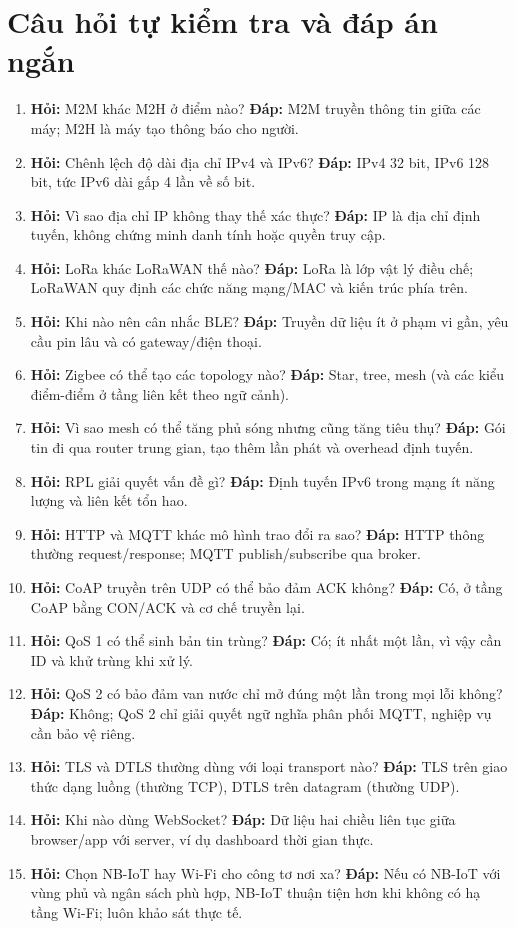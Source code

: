 \section{Câu hỏi tự kiểm tra và đáp án ngắn}
\begin{enumerate}[leftmargin=7mm,itemsep=7pt]
\item \textbf{Hỏi:} M2M khác M2H ở điểm nào? \textbf{Đáp:} M2M truyền thông tin giữa các máy; M2H là máy tạo thông báo cho người.
\item \textbf{Hỏi:} Chênh lệch độ dài địa chỉ IPv4 và IPv6? \textbf{Đáp:} IPv4 32 bit, IPv6 128 bit, tức IPv6 dài gấp 4 lần về số bit.
\item \textbf{Hỏi:} Vì sao địa chỉ IP không thay thế xác thực? \textbf{Đáp:} IP là địa chỉ định tuyến, không chứng minh danh tính hoặc quyền truy cập.
\item \textbf{Hỏi:} LoRa khác LoRaWAN thế nào? \textbf{Đáp:} LoRa là lớp vật lý điều chế; LoRaWAN quy định các chức năng mạng/MAC và kiến trúc phía trên.
\item \textbf{Hỏi:} Khi nào nên cân nhắc BLE? \textbf{Đáp:} Truyền dữ liệu ít ở phạm vi gần, yêu cầu pin lâu và có gateway/điện thoại.
\item \textbf{Hỏi:} Zigbee có thể tạo các topology nào? \textbf{Đáp:} Star, tree, mesh (và các kiểu điểm-điểm ở tầng liên kết theo ngữ cảnh).
\item \textbf{Hỏi:} Vì sao mesh có thể tăng phủ sóng nhưng cũng tăng tiêu thụ? \textbf{Đáp:} Gói tin đi qua router trung gian, tạo thêm lần phát và overhead định tuyến.
\item \textbf{Hỏi:} RPL giải quyết vấn đề gì? \textbf{Đáp:} Định tuyến IPv6 trong mạng ít năng lượng và liên kết tổn hao.
\item \textbf{Hỏi:} HTTP và MQTT khác mô hình trao đổi ra sao? \textbf{Đáp:} HTTP thông thường request/response; MQTT publish/subscribe qua broker.
\item \textbf{Hỏi:} CoAP truyền trên UDP có thể bảo đảm ACK không? \textbf{Đáp:} Có, ở tầng CoAP bằng CON/ACK và cơ chế truyền lại.
\item \textbf{Hỏi:} QoS 1 có thể sinh bản tin trùng? \textbf{Đáp:} Có; ít nhất một lần, vì vậy cần ID và khử trùng khi xử lý.
\item \textbf{Hỏi:} QoS 2 có bảo đảm van nước chỉ mở đúng một lần trong mọi lỗi không? \textbf{Đáp:} Không; QoS 2 chỉ giải quyết ngữ nghĩa phân phối MQTT, nghiệp vụ cần bảo vệ riêng.
\item \textbf{Hỏi:} TLS và DTLS thường dùng với loại transport nào? \textbf{Đáp:} TLS trên giao thức dạng luồng (thường TCP), DTLS trên datagram (thường UDP).
\item \textbf{Hỏi:} Khi nào dùng WebSocket? \textbf{Đáp:} Dữ liệu hai chiều liên tục giữa browser/app với server, ví dụ dashboard thời gian thực.
\item \textbf{Hỏi:} Chọn NB-IoT hay Wi-Fi cho công tơ nơi xa? \textbf{Đáp:} Nếu có NB-IoT với vùng phủ và ngân sách phù hợp, NB-IoT thuận tiện hơn khi không có hạ tầng Wi-Fi; luôn khảo sát thực tế.
\end{enumerate}

